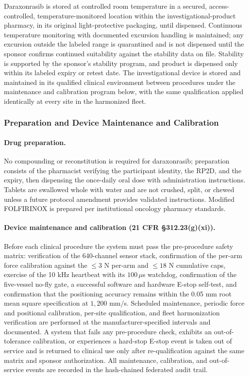Daraxonrasib is stored at controlled room temperature in a secured,
access-controlled, temperature-monitored location within the investigational-product
pharmacy, in its original light-protective packaging, until dispensed. Continuous
temperature monitoring with documented excursion handling is maintained; any
excursion outside the labeled range is quarantined and is not dispensed until the
sponsor confirms continued suitability against the stability data on file. Stability
is supported by the sponsor's stability program, and product is dispensed only
within its labeled expiry or retest date. The investigational device is stored and
maintained in its qualified clinical environment between procedures under the
maintenance and calibration program below, with the same qualification applied
identically at every site in the harmonized fleet.

\subsubsection{Preparation and Device Maintenance and Calibration}

\paragraph{Drug preparation.}
No compounding or reconstitution is required for daraxonrasib; preparation consists
of the pharmacist verifying the participant identity, the RP2D, and the expiry, then
dispensing the once-daily oral dose with administration instructions. Tablets are
swallowed whole with water and are not crushed, split, or chewed unless a future
protocol amendment provides validated instructions. Modified FOLFIRINOX is prepared
per institutional oncology pharmacy standards.

\paragraph{Device maintenance and calibration (21 CFR \S312.23(g)(xi)).}
Before each clinical procedure the system must pass the pre-procedure safety matrix:
verification of the 640-channel sensor stack, confirmation of the per-arm force
calibration against the $\leq 3$ N per-arm and $\leq 18$ N cumulative caps, exercise
of the 10 kHz heartbeat with its $100\,\mu$s watchdog, confirmation of the
five-vessel no-fly gate, a successful software and hardware E-stop self-test, and
confirmation that the positioning accuracy remains within the 0.05 mm root mean
square specification at $1{,}200$ mm/s. Scheduled maintenance, periodic force and
positional calibration, per-site qualification, and fleet harmonization verification
are performed at the manufacturer-specified intervals and documented. A system that
fails any pre-procedure check, exhibits an out-of-tolerance calibration, or
experiences a hard-stop E-stop event is taken out of service and is returned to
clinical use only after re-qualification against the same matrix and sponsor
authorization. All maintenance, calibration, and out-of-service events are recorded
in the hash-chained federated audit trail.

